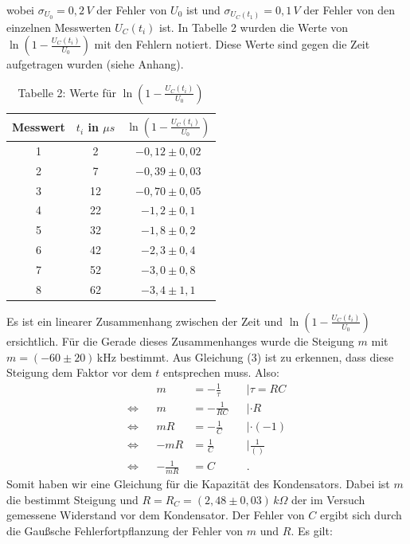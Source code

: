 wobei $\sigma_{U_0}=0,2\,V$ der Fehler von $U_0$ ist und $\sigma_{U_C(t_1)}=0,1\,V$ der Fehler von den einzelnen Messwerten $U_C(t_i)$ ist. In Tabelle 2 wurden die Werte von $\ln\left(1-\frac{U_C(t_i)}{U_0}\right)$ mit den Fehlern notiert. Diese Werte sind gegen die Zeit aufgetragen wurden (siehe Anhang).
    \begin{table}[t]
        \centering
        \begin{tabular}{|c|c|c|}
            \hline
            Messwert& $t_i$ in $\mu s$ & $\ln\left(1-\frac{U_C(t_i)}{U_0}\right)$\\
            \hline
            \hline
            1 & 2 & $-0,12\pm0,02$ \\
            \hline
            2 & 7 & $-0,39\pm0,03$ \\
            \hline
            3 & 12 & $-0,70\pm0,05$ \\
            \hline
            4 & 22 & $-1,2\pm0,1$ \\
            \hline
            5 & 32 & $-1,8\pm0,2$ \\
            \hline
            6 & 42 & $-2,3\pm0,4$ \\
            \hline
            7 & 52 & $-3,0\pm0,8$ \\
            \hline
            8 & 62 & $-3,4\pm1,1$ \\
            \hline
        \end{tabular}
        \caption*{Tabelle 2: \small Werte für $\ln\left(1-\frac{U_C(t_i)}{U_0}\right)$}
    \end{table} 
Es ist ein linearer Zusammenhang zwischen der Zeit und $\ln\left(1-\frac{U_C(t_i)}{U_0}\right)$ ersichtlich. Für die Gerade dieses Zusammenhanges wurde die Steigung $m$ mit $m=(-60\pm20)\,$kHz bestimmt. Aus Gleichung (3) ist zu erkennen, dass diese Steigung dem Faktor vor dem $t$ entsprechen muss. Also:
\begin{align}
   && m&=-\frac{1}{\tau} && |\tau=RC \nonumber\\
   \Leftrightarrow && m&= -\frac{1}{RC} && |\cdot R \nonumber\\
   \Leftrightarrow && mR&= -\frac{1}{C} && |\cdot (-1) \nonumber\\
   \Leftrightarrow && -mR&= \frac{1}{C} && |\frac{1}{()} \nonumber\\
   \Leftrightarrow &&  -\frac{1}{mR}  &= C &&.
\end{align}
Somit haben wir eine Gleichung für die Kapazität des Kondensators. Dabei ist $m$ die bestimmt Steigung und $R=R_C=(2,48\pm0,03)\,k\Omega$ der im Versuch gemessene Widerstand vor dem Kondensator. Der Fehler von $C$ ergibt sich durch die Gaußsche Fehlerfortpflanzung der Fehler von $m$ und $R$. Es gilt:

